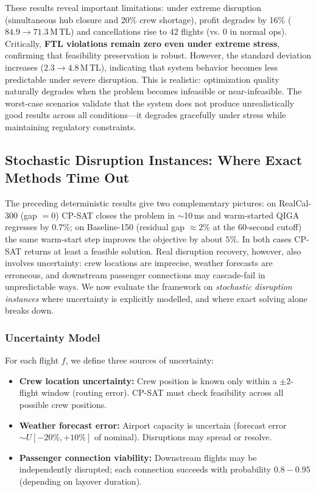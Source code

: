\documentclass[12pt,number]{elsarticle}
\begin{document}
These results reveal important limitations: under extreme disruption (simultaneous hub closure and 20\% crew shortage), profit degrades by 16\% ($84.9 \to 71.3$\,M\,TL) and cancellations rise to 42 flights (vs. 0 in normal ops). Critically, \textbf{FTL violations remain zero even under extreme stress}, confirming that feasibility preservation is robust. However, the standard deviation increases ($2.3 \to 4.8$\,M\,TL), indicating that system behavior becomes less predictable under severe disruption. This is realistic: optimization quality naturally degrades when the problem becomes infeasible or near-infeasible. The worst-case scenarios validate that the system does not produce unrealistically good results across all conditions---it degrades gracefully under stress while maintaining regulatory constraints.

\subsection{Stochastic Disruption Instances: Where Exact Methods Time Out}
\label{sec:stochastic}

The preceding deterministic results give two complementary pictures: on RealCal-300 (gap $=0$) CP-SAT closes the problem in $\sim$10\,ms and warm-started QIGA regresses by $0.7\%$; on Baseline-150 (residual gap $\approx 2\%$ at the 60-second cutoff) the same warm-start step improves the objective by about $5\%$. In both cases CP-SAT returns at least a feasible solution. Real disruption recovery, however, also involves uncertainty: crew locations are imprecise, weather forecasts are erroneous, and downstream passenger connections may cascade-fail in unpredictable ways. We now evaluate the framework on \emph{stochastic disruption instances} where uncertainty is explicitly modelled, and where exact solving alone breaks down.

\subsubsection{Uncertainty Model}

For each flight $f$, we define three sources of uncertainty:

\begin{itemize}
\item \textbf{Crew location uncertainty:} Crew position is known only within a $\pm 2$-flight window (routing error). CP-SAT must check feasibility across all possible crew positions.
\item \textbf{Weather forecast error:} Airport capacity is uncertain (forecast error $\sim U[-20\%, +10\%]$ of nominal). Disruptions may spread or resolve.
\item \textbf{Passenger connection viability:} Downstream flights may be independently disrupted; each connection succeeds with probability $0.8-0.95$ (depending on layover duration).
\end{itemize}
\end{document}
